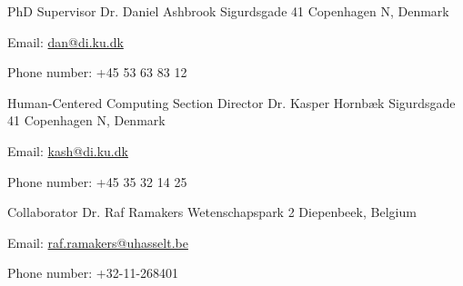 \begin{cventries}
  \cventry
    {PhD Supervisor}
    {Dr. Daniel Ashbrook}
    {Sigurdsgade 41}
    {Copenhagen N, Denmark}
    {
      \begin{cvitems}
        \item{Email: \href{mailto:dan@di.ku.dk}{dan@di.ku.dk}}
        \item{Phone number: +45 53 63 83 12}
      \end{cvitems}
      \vspace{1em}
    }

  \cventry
    {Human-Centered Computing Section Director}
    {Dr. Kasper Hornb\ae k}
    {Sigurdsgade 41}
    {Copenhagen N, Denmark}
    {
      \begin{cvitems}
        \item{Email: \href{mailto:kash@di.ku.dk}{kash@di.ku.dk}}
        \item{Phone number: +45 35 32 14 25}
      \end{cvitems}
      \vspace{1em}
    }

  \cventry
    {Collaborator}
    {Dr. Raf Ramakers}
    {Wetenschapspark 2}
    {Diepenbeek, Belgium}
    {
      \begin{cvitems}
        \item{Email: \href{mailto:raf.ramakers@uhasselt.be}{raf.ramakers@uhasselt.be}}
        \item{Phone number: ​+32-11-268401}
      \end{cvitems}
      \vspace{1em}
    }

\end{cventries}
